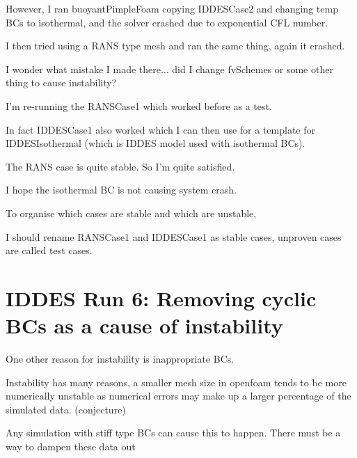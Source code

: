 \documentclass[12pt]{article}
\renewcommand{\_}{\kern-1.5pt\textunderscore\kern-1.5pt}
\begin{document}
However, I ran buoyantPimpleFoam copying IDDESCase2 and changing temp BCs to isothermal, and the solver crashed due to exponential CFL number.\par

I then tried using a RANS type mesh and ran the same thing, again it crashed. \par

I wonder what mistake I made there$ \ldots $  did I change fvSchemes or some other thing to cause instability?\par

I’m re-running the RANSCase1 which worked before as a test.\par

In fact IDDESCase1 also worked which I can then use for a template for IDDESIsothermal (which is IDDES model used with isothermal BCs).\par


\vspace{\baselineskip}
The RANS case is quite stable. So I’m quite satisfied.\par

I hope the isothermal BC is not causing system crash.\par

To organise which cases are stable and which are unstable, \par

I should rename RANSCase1 and IDDESCase1 as stable cases, unproven cases are called test cases.\par


\vspace{\baselineskip}
\section{IDDES Run 6: Removing cyclic BCs as a cause of instability}\par

One other reason for instability is inappropriate BCs. \par

Instability has many reasons, a smaller mesh size in openfoam tends to be more numerically unstable as numerical errors may make up a larger percentage of the simulated data. (conjecture)\par

Any simulation with stiff type BCs can cause this to happen. There must be a way to dampen these data out\par
\end{document}
